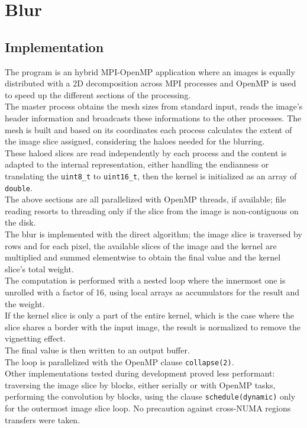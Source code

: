 \documentclass[a4paper, 11pt]{article}
\begin{document}
\section{Blur}

\subsection{Implementation}
The program is an hybrid MPI-OpenMP application where an images is equally distributed with a 2D decomposition across MPI processes and OpenMP is used to speed up the different sections of the processing.\\
The master process obtains the mesh sizes from standard input, reads the image's header information and broadcasts these informations to the other processes. The mesh is built and based on its coordinates each process calculates the extent of the image slice assigned, considering the haloes needed for the blurring.\\
These haloed slices are read independently by each process and the content is adapted to the internal representation, either handling the endianness or translating the \texttt{uint8\_t} to \texttt{uint16\_t}, then the kernel is initialized as an array of \texttt{double}.\\
The above sections are all parallelized with OpenMP threads, if available; file reading resorts to threading only if the slice from the image is non-contiguous on the disk.\\
The blur is implemented with the direct algorithm; the image slice is traversed by rows and for each pixel, the available slices of the image and the kernel are multiplied and summed elementwise to obtain the final value and the kernel slice's total weight.\\
The computation is performed with a nested loop where the innermost one is unrolled with a factor of 16, using local arrays as accumulators for the result and the weight.\\
If the kernel slice is only a part of the entire kernel, which is the case where the slice shares a border with the input image, the result is normalized to remove the vignetting effect.\\
The final value is then written to an output buffer.\\
The loop is parallelized with the OpenMP clause \texttt{collapse(2)}.\\
Other implementations tested during development proved less performant: traversing the image slice by blocks, either serially or with OpenMP tasks, performing the convolution by blocks, using the clause \texttt{schedule(dynamic)} only for the outermost image slice loop. No precaution against cross-NUMA regions transfers were taken.\\
\end{document}

